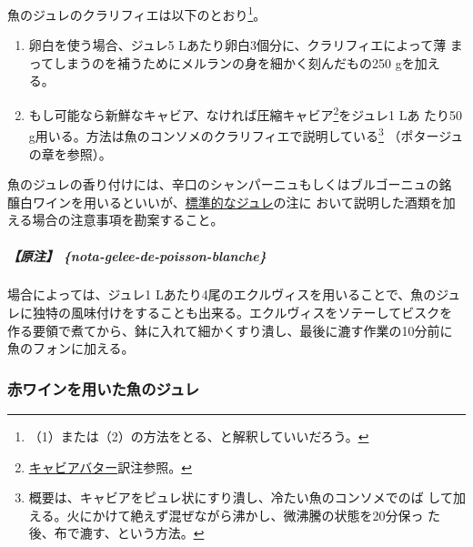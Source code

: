 \begin{recette}
魚のジュレのクラリフィエは以下のとおり\footnote{（1）または（2）の方法をとる、と解釈していいだろう。}。

\begin{enumerate}
\def\labelenumi{\arabic{enumi}.}
\item
  卵白を使う場合、ジュレ5 Lあたり卵白3個分に、クラリフィエによって薄
  まってしまうのを補うためにメルランの身を細かく刻んだもの250 gを加え
  る。
\item
  もし可能なら新鮮なキャビア、なければ圧縮キャビア\footnote{\protect\hyperlink{beurre-de-caviar}{キャビアバター}訳注参照。}をジュレ1
  Lあ たり50
  g用いる。方法は魚のコンソメのクラリフィエで説明している\footnote{概要は、キャビアをピュレ状にすり潰し、冷たい魚のコンソメでのば
    して加える。火にかけて絶えず混ぜながら沸かし、微沸騰の状態を20分保っ
    た後、布で漉す、という方法。} （ポタージュの章を参照）。
\end{enumerate}

魚のジュレの香り付けには、辛口のシャンパーニュもしくはブルゴーニュの銘
醸白ワインを用いるといいが、\protect\hyperlink{gelees-ordinaires}{標準的なジュレ}の注に
おいて説明した酒類を加える場合の注意事項を勘案すること。

\hypertarget{ux539fux6ce8-nota-gelee-de-poisson-blanche}{%
\subparagraph{【原注】
\{nota-gelee-de-poisson-blanche\}}\label{ux539fux6ce8-nota-gelee-de-poisson-blanche}}

場合によっては、ジュレ1 Lあたり4尾のエクルヴィスを用いることで、魚のジュ
レに独特の風味付けをすることも出来る。エクルヴィスをソテーしてビスクを
作る要領で煮てから、鉢に入れて細かくすり潰し、最後に漉す作業の10分前に
魚のフォンに加える。

\maeaki

\hypertarget{gelee-de-poisson-au-vin-rouge}{%
\subsubsection{赤ワインを用いた魚のジュレ}\label{gelee-de-poisson-au-vin-rouge}}




\end{recette}
